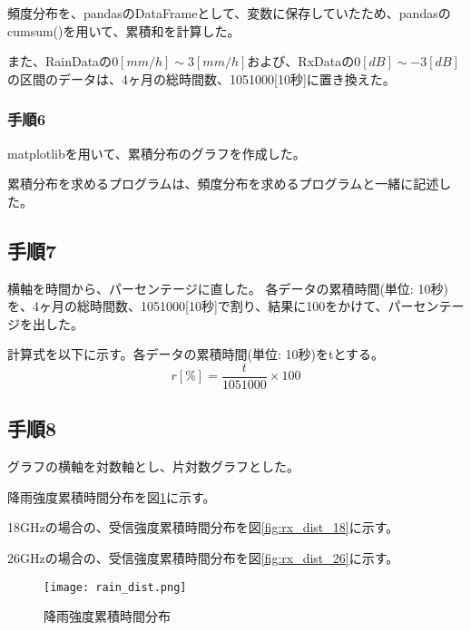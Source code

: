 \documentclass[a4paper, 11pt, titlepage]{jsarticle}
\begin{document}
頻度分布を、pandasのDataFrameとして、変数に保存していたため、pandasのcumsum()を用いて、累積和を計算した。

また、RainDataの$0[mm/h] \sim 3[mm/h]$および、RxDataの$0[dB] \sim -3[dB]$の区間のデータは、4ヶ月の総時間数、1051000[10秒]に置き換えた。







\subsubsection{手順6}
matplotlibを用いて、累積分布のグラフを作成した。

累積分布を求めるプログラムは、頻度分布を求めるプログラムと一緒に記述した。

\subsection{手順7}
横軸を時間から、パーセンテージに直した。
各データの累積時間(単位: 10秒)を、4ヶ月の総時間数、1051000[10秒]で割り、結果に100をかけて、パーセンテージを出した。

計算式を以下に示す。各データの累積時間(単位: 10秒)をtとする。
$$
r [\%] = \frac{t}{1051000} \times 100
$$

\subsection{手順8}
グラフの横軸を対数軸とし、片対数グラフとした。

降雨強度累積時間分布を図\ref{fig:rain_dist}に示す。

18GHzの場合の、受信強度累積時間分布を図\ref{fig:rx_dist_18}に示す。

26GHzの場合の、受信強度累積時間分布を図\ref{fig:rx_dist_26}に示す。

\begin{figure}[H]
	\centering
	\texttt{[image: rain\_dist.png]}
	\caption{降雨強度累積時間分布}
	\label{fig:rain_dist}
\end{figure}
\end{document}
